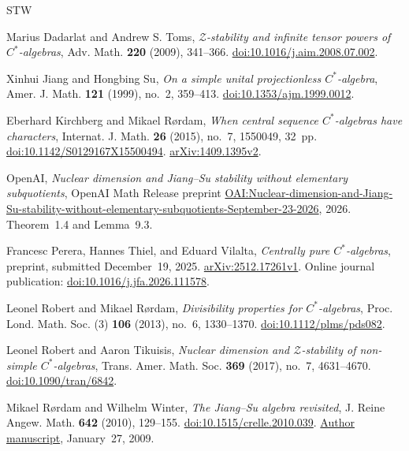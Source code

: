 \begin{thebibliography}{STW}
\raggedright

Marius Dadarlat and Andrew S. Toms,
\emph{$\mathcal Z$-stability and infinite tensor powers of $C^*$-algebras},
Adv. Math. \textbf{220} (2009), 341--366.
\href{https://doi.org/10.1016/j.aim.2008.07.002}{doi:10.1016/j.aim.2008.07.002}.

Xinhui Jiang and Hongbing Su,
\emph{On a simple unital projectionless $C^*$-algebra},
Amer. J. Math. \textbf{121} (1999), no.~2, 359--413.
\href{https://doi.org/10.1353/ajm.1999.0012}{doi:10.1353/ajm.1999.0012}.

Eberhard Kirchberg and Mikael R\o rdam,
\emph{When central sequence $C^*$-algebras have characters},
Internat. J. Math. \textbf{26} (2015), no.~7, 1550049, 32~pp.
\href{https://doi.org/10.1142/S0129167X15500494}{doi:10.1142/S0129167X15500494}.
\href{https://arxiv.org/abs/1409.1395v2}{arXiv:1409.1395v2}.

OpenAI,
\emph{Nuclear dimension and Jiang--Su stability without elementary
subquotients},
OpenAI Math Release preprint
\href{https://github.com/openai/math/blob/main/preprints/Nuclear-dimension-and-Jiang-Su-stability-without-elementary-subquotients-September-23-2026/paper.pdf}{OAI:Nuclear-dimension-and-Jiang-Su-stability-without-elementary-subquotients-September-23-2026},
2026.
Theorem~1.4 and Lemma~9.3.

Francesc Perera, Hannes Thiel, and Eduard Vilalta,
\emph{Centrally pure $C^*$-algebras},
preprint, submitted December~19, 2025.
\href{https://arxiv.org/abs/2512.17261v1}{arXiv:2512.17261v1}.
Online journal publication:
\href{https://doi.org/10.1016/j.jfa.2026.111578}{doi:10.1016/j.jfa.2026.111578}.

Leonel Robert and Mikael R\o rdam,
\emph{Divisibility properties for $C^*$-algebras},
Proc. Lond. Math. Soc. (3) \textbf{106} (2013), no.~6, 1330--1370.
\href{https://doi.org/10.1112/plms/pds082}{doi:10.1112/plms/pds082}.

Leonel Robert and Aaron Tikuisis,
\emph{Nuclear dimension and $\mathcal Z$-stability of non-simple
$C^*$-algebras},
Trans. Amer. Math. Soc. \textbf{369} (2017), no.~7, 4631--4670.
\href{https://doi.org/10.1090/tran/6842}{doi:10.1090/tran/6842}.

Mikael R\o rdam and Wilhelm Winter,
\emph{The Jiang--Su algebra revisited},
J. Reine Angew. Math. \textbf{642} (2010), 129--155.
\href{https://doi.org/10.1515/crelle.2010.039}{doi:10.1515/crelle.2010.039}.
\href{https://web.math.ku.dk/~rordam/manus/jiang-su-revisited.pdf}{Author manuscript},
January~27, 2009.


\end{thebibliography}
